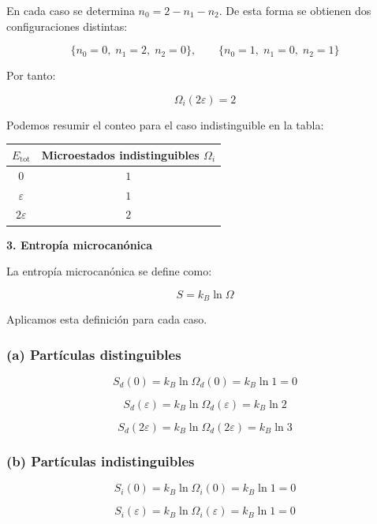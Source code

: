 \documentclass{article}
\begin{document}
En cada caso se determina \(n_{0} = 2-n_{1}-n_{2}\). De esta forma se obtienen
dos configuraciones distintas:

\[
\{n_{0}=0,\;n_{1}=2,\;n_{2}=0\},
\qquad
\{n_{0}=1,\;n_{1}=0,\;n_{2}=1\}
\]

Por tanto:

\[
\boxed{\Omega_{i}(2\varepsilon) = 2}
\]

Podemos resumir el conteo para el caso indistinguible en la tabla:

\begin{center}
\begin{tabular}{c|c}
\hline
\(E_{\mathrm{tot}}\) & Microestados indistinguibles \(\Omega_{i}\) \\
\hline
\(0\)           & \(1\) \\
\(\varepsilon\) & \(1\) \\
\(2\varepsilon\)& \(2\) \\
\hline
\end{tabular}
\end{center}


\textcolor{Apple Green}{\textbf{3. Entropía microcanónica}}

La entropía microcanónica se define como:

\[
S = k_{B}\ln \Omega
\]

Aplicamos esta definición para cada caso.

\subsubsection*{(a) Partículas distinguibles}

\[
S_{d}(0) = k_{B}\ln \Omega_{d}(0) = k_{B}\ln 1 = 0
\]

\[
S_{d}(\varepsilon) = k_{B}\ln \Omega_{d}(\varepsilon)
= k_{B}\ln 2
\]

\[
S_{d}(2\varepsilon) = k_{B}\ln \Omega_{d}(2\varepsilon)
= k_{B}\ln 3
\]

\subsubsection*{(b) Partículas indistinguibles}

\[
S_{i}(0) = k_{B}\ln \Omega_{i}(0) = k_{B}\ln 1 = 0
\]

\[
S_{i}(\varepsilon) = k_{B}\ln \Omega_{i}(\varepsilon)
= k_{B}\ln 1 = 0
\]
\end{document}
